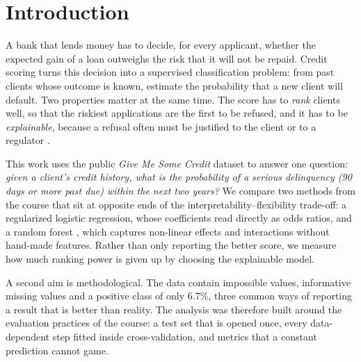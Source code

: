 \section{Introduction}
\label{sec:introduction}
A bank that lends money has to decide, for every applicant, whether the
expected gain of a loan outweighs the risk that it will not be repaid. Credit
scoring turns this decision into a supervised classification problem: from
past clients whose outcome is known, estimate the probability that a new
client will default. Two properties matter at the same time. The score has to
\emph{rank} clients well, so that the riskiest applications are the first to
be refused, and it has to be \emph{explainable}, because a refusal often must
be justified to the client or to a regulator \citep{oku2026slides}.

This work uses the public \emph{Give Me Some Credit} dataset
\citep{kaggle2011givemesomecredit} to answer one question: \emph{given a
client's credit history, what is the probability of a serious delinquency
(90 days or more past due) within the next two years?} We compare two methods
from the course that sit at opposite ends of the interpretability--flexibility
trade-off: a regularized logistic regression, whose coefficients read directly
as odds ratios, and a random forest \citep{breiman2001random}, which captures
non-linear effects and interactions without hand-made features. Rather than
only reporting the better score, we measure how much ranking power is given up
by choosing the explainable model.

A second aim is methodological. The data contain impossible values,
informative missing values and a positive class of only 6.7\%, three common
ways of reporting a result that is better than reality. The analysis was
therefore built around the evaluation practices of the course: a test set that
is opened once, every data-dependent step fitted inside cross-validation, and
metrics that a constant prediction cannot game.
